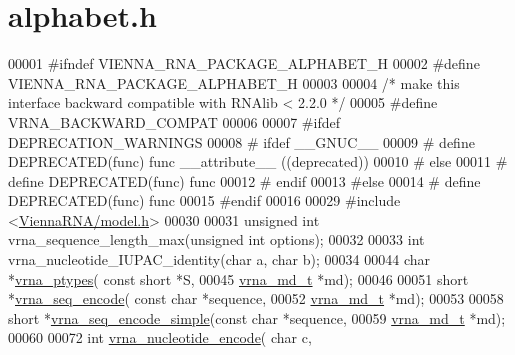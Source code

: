 \hypertarget{alphabet_8h_source}{}\section{alphabet.\+h}
\label{alphabet_8h_source}

\begin{DoxyCode}
00001 \textcolor{preprocessor}{#ifndef VIENNA\_RNA\_PACKAGE\_ALPHABET\_H}
00002 \textcolor{preprocessor}{#define VIENNA\_RNA\_PACKAGE\_ALPHABET\_H}
00003 
00004 \textcolor{comment}{/* make this interface backward compatible with RNAlib < 2.2.0 */}
00005 \textcolor{preprocessor}{#define VRNA\_BACKWARD\_COMPAT}
00006 
00007 \textcolor{preprocessor}{#ifdef DEPRECATION\_WARNINGS}
00008 \textcolor{preprocessor}{# ifdef \_\_GNUC\_\_}
00009 \textcolor{preprocessor}{#  define DEPRECATED(func) func \_\_attribute\_\_ ((deprecated))}
00010 \textcolor{preprocessor}{# else}
00011 \textcolor{preprocessor}{#  define DEPRECATED(func) func}
00012 \textcolor{preprocessor}{# endif}
00013 \textcolor{preprocessor}{#else}
00014 \textcolor{preprocessor}{# define DEPRECATED(func) func}
00015 \textcolor{preprocessor}{#endif}
00016 
00029 \textcolor{preprocessor}{#include <\hyperlink{model_8h}{ViennaRNA/model.h}>}
00030 
00031 \textcolor{keywordtype}{unsigned} \textcolor{keywordtype}{int} vrna\_sequence\_length\_max(\textcolor{keywordtype}{unsigned} \textcolor{keywordtype}{int} options);
00032 
00033 \textcolor{keywordtype}{int} vrna\_nucleotide\_IUPAC\_identity(\textcolor{keywordtype}{char} a, \textcolor{keywordtype}{char} b);
00034 
00044 \textcolor{keywordtype}{char}  *\hyperlink{group__utils_ga51a9e86a5f731f5f2f5584ee67cee4a8}{vrna\_ptypes}( \textcolor{keyword}{const} \textcolor{keywordtype}{short} *S,
00045                     \hyperlink{structvrna__md__s}{vrna\_md\_t} *md);
00046 
00051 \textcolor{keywordtype}{short} *\hyperlink{group__utils_ga636e7d6f888fd639587296a5eddea660}{vrna\_seq\_encode}( \textcolor{keyword}{const} \textcolor{keywordtype}{char} *sequence,
00052                         \hyperlink{structvrna__md__s}{vrna\_md\_t} *md);
00053 
00058 \textcolor{keywordtype}{short} *\hyperlink{group__utils_ga3cd79d21d53248ad2634c1c0d43e97d7}{vrna\_seq\_encode\_simple}(\textcolor{keyword}{const} \textcolor{keywordtype}{char} *sequence,
00059                               \hyperlink{structvrna__md__s}{vrna\_md\_t} *md);
00060 
00072 \textcolor{keywordtype}{int} \hyperlink{group__utils_gac12bf00123f88621c9be847b0879c1fb}{vrna\_nucleotide\_encode}( \textcolor{keywordtype}{char} c,

\end{DoxyCode}
